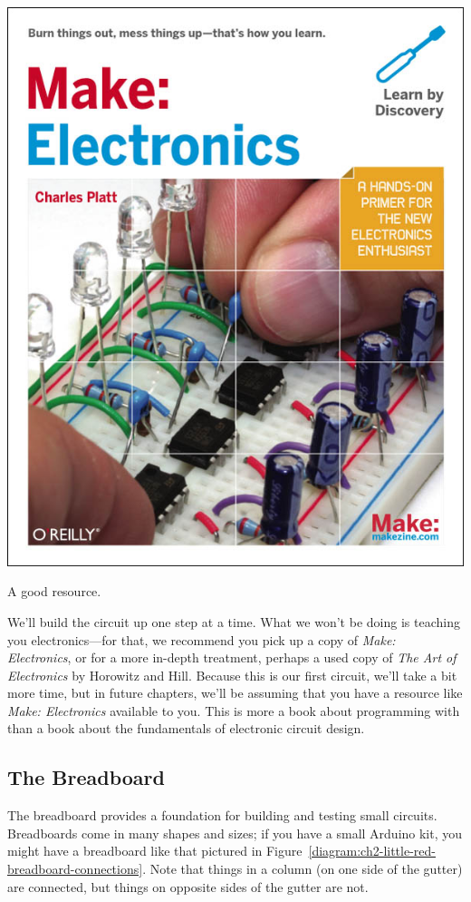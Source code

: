 \begin{floatingfigure}[r]{0.5\linewidth}
	  \begin{center}
    	\includegraphics[width=0.4\linewidth]{images/make-electronics-cover}
			\captionsetup{labelformat=empty,justification=centering,font=footnotesize}
   		\caption{A good resource.}
  \end{center}
\end{floatingfigure}

We'll build the circuit up one step at a time. What we won't be doing is teaching you electronics---for that, we recommend you pick up a copy of {\em Make: Electronics}, or for a more in-depth treatment, perhaps a used copy of {\em The Art of Electronics} by Horowitz and Hill. Because this is our first circuit, we'll take a bit more time, but in future chapters, we'll be assuming that you have a resource like {\em Make: Electronics} available to you. This is more a book about programming with \plumbing than a book about the fundamentals of electronic circuit design.

\newpage

\subsection{The Breadboard}
The breadboard provides a foundation for building and testing small circuits. Breadboards come in many shapes and sizes; if you have a small Arduino kit, you might have a breadboard like that pictured in Figure~\vref{diagram:ch2-little-red-breadboard-connections}. Note that things in a column (on one side of the gutter) are connected, but things on opposite sides of the gutter are not. 

